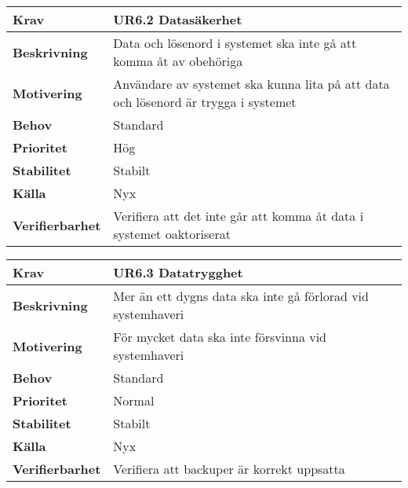 \documentclass[a4paper, twoside, 11pt, titlepage]{article}
\begin{document}
		\begin {table} [ht] \begin{tabular} { p{2.6cm} p{12.5cm} }
			\hline
			{\sffamily\textbf{Krav}} & {\sffamily\textbf{UR6.2 Datasäkerhet}} \\
			\hline
			{\sffamily\textbf{Beskrivning}} & {Data och lösenord i systemet ska inte gå att komma åt av obehöriga} \\
			\hline
			{\sffamily\textbf{Motivering}} & {Användare av systemet ska kunna lita på att data och lösenord är trygga i systemet} \\
			\hline
			{\sffamily\textbf{Behov}} & {Standard} \\
			\hline
			{\sffamily\textbf{Prioritet}} & {Hög} \\
			\hline
			{\sffamily\textbf{Stabilitet}} & {Stabilt} \\
			\hline
			{\sffamily\textbf{Källa}} & {Nyx} \\
			\hline
			{\sffamily\textbf{Verifierbarhet}} & {Verifiera att det inte går att komma åt data i systemet oaktoriserat} \\
			\hline
		\end{tabular} \end{table} \FloatBarrier
		\vspace{6mm}

		\begin {table} [ht] \begin{tabular} { p{2.6cm} p{12.5cm} }
			\hline
			{\sffamily\textbf{Krav}} & {\sffamily\textbf{UR6.3 Datatrygghet}} \\
			\hline
			{\sffamily\textbf{Beskrivning}} & {Mer än ett dygns data ska inte gå förlorad vid systemhaveri} \\
			\hline
			{\sffamily\textbf{Motivering}} & {För mycket data ska inte försvinna vid systemhaveri} \\
			\hline
			{\sffamily\textbf{Behov}} & {Standard} \\
			\hline
			{\sffamily\textbf{Prioritet}} & {Normal} \\
			\hline
			{\sffamily\textbf{Stabilitet}} & {Stabilt} \\
			\hline
			{\sffamily\textbf{Källa}} & {Nyx} \\
			\hline
			{\sffamily\textbf{Verifierbarhet}} & {Verifiera att backuper är korrekt uppsatta } \\
			\hline
		\end{tabular} \end{table} \FloatBarrier
\end{document}
